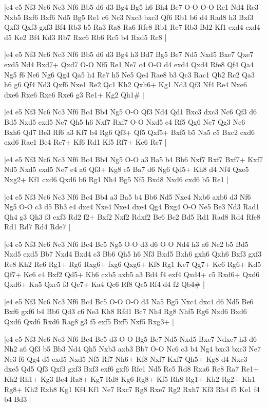 \whitename{}
\blackname{}
\makegametitle
|e4 e5 Nf3 Nc6 Nc3 Nf6 Bb5 d6 d3 Bg4 Bg5 h6 Bh4 Be7 O-O O-O Re1 Nd4 Re3 Nxb5 Bxf6 Bxf6 Nd5 Bg5 Re1 c6 Nc3 Nxc3 bxc3 Qf6 Rb1 b6 d4 Rad8 h3 Bxf3 Qxf3 Qxf3 gxf3 Bf4 Rb3 b5 Ra3 Ra8 Ra6 Rfc8 Rb1 Rc7 Rb3 Bd2 Kf1 exd4 cxd4 d5 Ke2 Bf4 Kd3 Rb7 Rxc6 Rb6 Rc5 b4 Rxd5 Rc8  |

\whitename{}
\blackname{}
\makegametitle
|e4 e5 Nf3 Nc6 Nc3 Nf6 Bb5 d6 d3 Bg4 h3 Bd7 Bg5 Be7 Nd5 Nxd5 Bxe7 Qxe7 exd5 Nd4 Bxd7+ Qxd7 O-O Nf5 Re1 Ne7 c4 O-O d4 exd4 Qxd4 Rfe8 Qf4 Qa4 Ng5 f6 Ne6 Ng6 Qg4 Qa5 h4 Re7 h5 Ne5 Qe4 Rae8 b3 Qc3 Rac1 Qb2 Rc2 Qa3 h6 g6 Qf4 Nd3 Qxf6 Nxe1 Re2 Qc1 Kh2 Qxh6+ Kg1 Nd3 Qf3 Nf4 Re4 Nxe6 dxe6 Rxe6 Rxe6 Rxe6 g3 Re1+ Kg2 Qh1\#  |

\whitename{}
\blackname{}
\makegametitle
|e4 e5 Nf3 Nc6 Nc3 Nf6 Bc4 Bb4 Ng5 O-O Qf3 Nd4 Qd1 Bxc3 dxc3 Nc6 Qf3 d6 Bd5 Nxd5 exd5 Ne7 Qh5 h6 Nxf7 Rxf7 O-O Nxd5 c4 Rf5 Qg6 Ne7 Qg3 Nc6 Bxh6 Qd7 Be3 Rf6 a3 Kf7 b4 Rg6 Qf3+ Qf5 Qxf5+ Bxf5 b5 Na5 c5 Bxc2 cxd6 cxd6 Rac1 Be4 Rc7+ Kf6 Rd1 Kf5 Rf7+ Ke6 Rc7  |

\whitename{}
\blackname{}
\makegametitle
|e4 e5 Nf3 Nc6 Nc3 Nf6 Bc4 Bb4 Ng5 O-O a3 Ba5 b4 Bb6 Nxf7 Rxf7 Bxf7+ Kxf7 Nd5 Nxd5 exd5 Ne7 c4 a6 Qf3+ Kg8 c5 Ba7 d6 Ng6 Qd5+ Kh8 d4 Nf4 Qxe5 Nxg2+ Kf1 cxd6 Qxd6 b6 Rg1 Nh4 Bg5 Nf5 Bxd8 Nxd6 cxd6 b5 Re1  |

\whitename{}
\blackname{}
\makegametitle
|e4 e5 Nf3 Nc6 Nc3 Nf6 Bc4 Bb4 a3 Ba5 b4 Bb6 Nd5 Nxe4 Nxb6 axb6 d3 Nf6 Ng5 O-O c3 d5 Bb3 e4 dxe4 Nxe4 Nxe4 dxe4 Qg4 Bxg4 O-O Ne5 Be3 Nd3 Rad1 Qh4 g3 Qh3 f3 exf3 Rd2 f2+ Bxf2 Nxf2 Rdxf2 Be6 Bc2 Bd5 Rd1 Rad8 Rd4 Rfe8 Rd1 Rd7 Rd4 Rde7  |

\whitename{}
\blackname{}
\makegametitle
|e4 e5 Nf3 Nc6 Nc3 Nf6 Bc4 Bc5 Ng5 O-O d3 d6 O-O Nd4 h3 a6 Ne2 b5 Bd5 Nxd5 exd5 Bb7 Nxd4 Bxd4 c3 Bb6 Qh5 h6 Nf3 Bxd5 Bxh6 gxh6 Qxh6 Bxf3 gxf3 Re8 Kh2 Re6 Rg1+ Rg6 Rxg6+ fxg6 Qxg6+ Kf8 Rg1 Ke7 Qg7+ Ke6 Rg6+ Kd5 Qf7+ Kc6 c4 Bxf2 Qd5+ Kb6 cxb5 axb5 a3 Bd4 f4 exf4 Qxd4+ c5 Rxd6+ Qxd6 Qxd6+ Ka5 Qxc5 f3 Qc7+ Ka4 Qc6 Rf8 Qc5 Rf4 d4 f2 Qb4\#  |

\whitename{}
\blackname{}
\makegametitle
|e4 e5 Nf3 Nc6 Nc3 Nf6 Bc4 Bc5 O-O O-O d3 Na5 Bg5 Nxc4 dxc4 d6 Nd5 Be6 Bxf6 gxf6 b4 Bb6 Qd3 c6 Ne3 Kh8 Rfd1 Bc7 Nh4 Rg8 Nhf5 Rg6 Nxd6 Bxd6 Qxd6 Qxd6 Rxd6 Rag8 g3 f5 exf5 Bxf5 Nxf5 Rxg3+  |

\whitename{}
\blackname{}
\makegametitle
|e4 e5 Nf3 Nc6 Nc3 Nf6 Bc4 Bc5 d3 O-O Bg5 Be7 Nd5 Nxd5 Bxe7 Ndxe7 h3 d6 Nh2 a6 Qf3 b5 Bb3 Nd4 Qh5 Nxb3 axb3 Bb7 O-O Nc6 c3 b4 Ng4 bxc3 bxc3 Ne7 Ne3 f6 Qg4 d5 exd5 Nxd5 Nf5 Rf7 Nh6+ Kf8 Nxf7 Kxf7 Qh5+ Kg8 d4 Nxc3 dxe5 Qd5 Qf3 Qxf3 gxf3 Bxf3 exf6 gxf6 Rfc1 Nd5 Rc5 Rd8 Rxa6 Re8 Ra7 Re1+ Kh2 Rh1+ Kg3 Be4 Ra8+ Kg7 Rd8 Kg6 Rg8+ Kf5 Rh8 Rg1+ Kh2 Rg2+ Kh1 Rg8+ Kh2 Rxh8 Kg1 Kf4 Kf1 Ne7 Rxc7 Rg8 Rxe7 Rg2 Rxh7 Kf3 Rh4 f5 Ke1 f4 b4 Bd3  |

